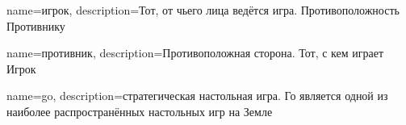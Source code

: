 %
{
	name={игрок},
	description={Тот, от чьего лица ведётся игра. Противоположность \gls{Противник}у}
}

%
{
	name={противник}, 
	description={Противоположная сторона. Тот, с кем играет \gls{Игрок}}
}

%
{
	name={go}, 
	description={стратегическая настольная игра. Го является одной из наиболее распространённых настольных игр на Земле\cite{goWiki}}
}



